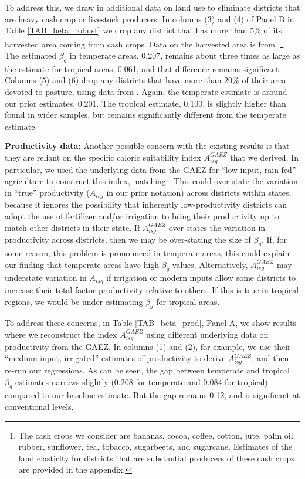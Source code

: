 \documentclass[11pt]{article}
\begin{document}
To address this, we draw in additional data on land use to eliminate districts that are heavy cash crop or livestock producers. In columns (3) and (4) of Panel B in Table \ref{TAB_beta_robust} we drop any district that has more than 5\% of its harvested area coming from cash crops. Data on the harvested area is from \cite{mrf2008}.\footnote{The cash crops we consider are bananas, cocoa, coffee, cotton, jute, palm oil, rubber, sunflower, tea, tobacco, sugarbeets, and sugarcane. Estimates of the land elasticity for districts that are substantial producers of these cash crops are provided in the appendix.} The estimated $\beta_g$ in temperate areas, 0.207, remains about three times as large as the estimate for tropical areas, 0.061, and that difference remains significant. Columns (5) and (6) drop any districts that have more than 20\% of their area devoted to pasture, using data from \cite{remf2008}. Again, the temperate estimate is around our prior estimates, 0.201. The tropical estimate, 0.100, is slightly higher than found in wider samples, but remains significantly different from the temperate estimate.

\vspace{.5cm}\noindent\textbf{Productivity data:} Another possible concern with the existing results is that they are reliant on the specific caloric suitability index $A_{isg}^{GAEZ}$ that we derived. In particular, we used the underlying data from the GAEZ for ``low-input, rain-fed'' agriculture to construct this index, matching \cite{galorozak2016}. This could over-state the variation in ``true'' productivity ($A_{isg}$ in our prior notation) across districts within states, because it ignores the possibility that inherently low-productivity districts can adopt the use of fertilizer and/or irrigation to bring their productivity up to match other districts in their state. If $A_{isg}^{GAEZ}$ over-states the variation in productivity across districts, then we may be over-stating the size of $\beta_g$. If, for some reason, this problem is pronounced in temperate areas, this could explain our finding that temperate areas have high $\beta_g$ values. Alternatively, $A_{isg}^{GAEZ}$ may understate variation in $A_{isg}$ if irrigation or modern inputs allow some districts to increase their total factor productivity relative to others. If this is true in tropical regions, we would be under-estimating $\beta_g$ for tropical areas.

To address these concerns, in Table \ref{TAB_beta_prod}, Panel A, we show results where we reconstruct the index $A_{isg}^{GAEZ}$ using different underlying data on productivity from the GAEZ. In columns (1) and (2), for example, we use their ``medium-input, irrigated'' estimates of productivity to derive $A_{isg}^{GAEZ}$, and then re-run our regressions. As can be seen, the gap between temperate and tropical $\beta_g$ estimates narrows slightly (0.208 for temperate and 0.084 for tropical) compared to our baseline estimate. But the gap remains 0.12, and is significant at conventional levels.
\end{document}
